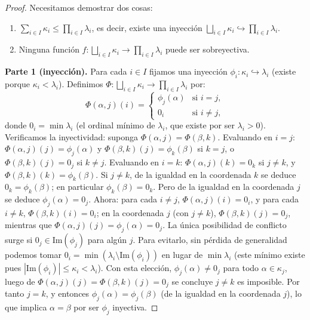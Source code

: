 \begin{proof}
Necesitamos demostrar dos cosas:
\begin{enumerate}[leftmargin=2em, label=(\arabic*)]
  \item $\sum_{i \in I} \kappa_i \leq \prod_{i \in I} \lambda_i$, es decir, existe una inyección $\bigsqcup_{i \in I} \kappa_i \hookrightarrow \prod_{i \in I} \lambda_i$.
  \item Ninguna función $f \colon \bigsqcup_{i \in I} \kappa_i \to \prod_{i \in I} \lambda_i$ puede ser sobreyectiva.
\end{enumerate}

\textbf{Parte 1 (inyección).} Para cada $i \in I$ fijamos una inyección $\phi_i \colon \kappa_i \hookrightarrow \lambda_i$ (existe porque $\kappa_i < \lambda_i$). Definimos $\Phi \colon \bigsqcup_{i \in I} \kappa_i \to \prod_{i \in I} \lambda_i$ por:
\[
  \Phi(\alpha, j)(i) = \begin{cases} \phi_j(\alpha) & \text{si } i = j, \\ 0_i & \text{si } i \neq j, \end{cases}
\]
donde $0_i = \min \lambda_i$ (el ordinal mínimo de $\lambda_i$, que existe por ser $\lambda_i > 0$). Verificamos la inyectividad: suponga $\Phi(\alpha, j) = \Phi(\beta, k)$. Evaluando en $i = j$: $\Phi(\alpha,j)(j) = \phi_j(\alpha)$ y $\Phi(\beta,k)(j) = \phi_k(\beta)$ si $k = j$, o $\Phi(\beta,k)(j) = 0_j$ si $k \neq j$. Evaluando en $i = k$: $\Phi(\alpha,j)(k) = 0_k$ si $j \neq k$, y $\Phi(\beta,k)(k) = \phi_k(\beta)$. Si $j \neq k$, de la igualdad en la coordenada $k$ se deduce $0_k = \phi_k(\beta)$; en particular $\phi_k(\beta) = 0_k$. Pero de la igualdad en la coordenada $j$ se deduce $\phi_j(\alpha) = 0_j$. Ahora: para cada $i \neq j$, $\Phi(\alpha,j)(i) = 0_i$, y para cada $i \neq k$, $\Phi(\beta,k)(i) = 0_i$; en la coordenada $j$ (con $j \neq k$), $\Phi(\beta,k)(j) = 0_j$, mientras que $\Phi(\alpha,j)(j) = \phi_j(\alpha) = 0_j$. La única posibilidad de conflicto surge si $0_j \in \mathrm{Im}(\phi_j)$ para algún $j$. Para evitarlo, sin pérdida de generalidad podemos tomar $0_i = \min(\lambda_i \setminus \mathrm{Im}(\phi_i))$ en lugar de $\min \lambda_i$ (este mínimo existe pues $|\mathrm{Im}(\phi_i)| \leq \kappa_i < \lambda_i$). Con esta elección, $\phi_j(\alpha) \neq 0_j$ para todo $\alpha \in \kappa_j$, luego de $\Phi(\alpha,j)(j) = \Phi(\beta,k)(j) = 0_j$ se concluye $j \neq k$ es imposible. Por tanto $j = k$, y entonces $\phi_j(\alpha) = \phi_j(\beta)$ (de la igualdad en la coordenada $j$), lo que implica $\alpha = \beta$ por ser $\phi_j$ inyectiva.


\end{proof}
